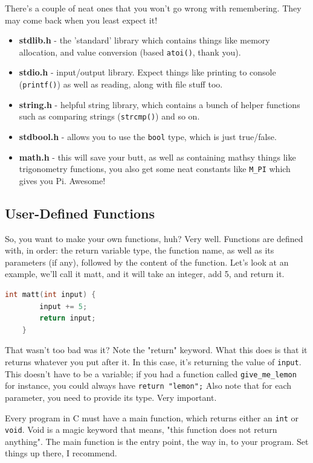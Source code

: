 There's a couple of neat ones that you won't go wrong with remembering. They may come back when you least expect it!
\begin{itemize}
    \item \textbf{stdlib.h} - the 'standard' library which contains things like memory allocation, and value conversion (based \texttt{atoi()}, thank you).
    \item \textbf{stdio.h} - input/output library. Expect things like printing to console (\texttt{printf()}) as well as reading, along with file stuff too.
    \item \textbf{string.h} - helpful string library, which contains a bunch of helper functions such as comparing strings (\texttt{strcmp()}) and so on.
    \item \textbf{stdbool.h} - allows you to use the \texttt{bool} type, which is just true/false.
    \item \textbf{math.h} - this will save your butt, as well as containing mathsy things like trigonometry functions, you also get some neat constants like \texttt{M\_PI} which gives you Pi. Awesome!
\end{itemize}

\subsection{User-Defined Functions}
So, you want to make your own functions, huh? Very well. Functions are defined with, in order: the return variable type, the function name, as well as its \glspl{parameter} (if any), followed by the content of the function. Let's look at an example, we'll call it matt, and it will take an integer, add 5, and return it.
\begin{lstlisting}[language=C]
    int matt(int input) {
        input += 5;
        return input;
    }
\end{lstlisting}

That wasn't too bad was it? Note the "return" keyword. What this does is that it returns whatever you put after it. In this case, it's returning the value of \texttt{input}. This doesn't have to be a variable; if you had a function called \texttt{give\_me\_lemon} for instance, you could always have \texttt{return "lemon";} Also note that for each parameter, you need to provide its type. Very important.

Every program in C must have a main function, which returns either an \texttt{int} or \texttt{void}. Void is a magic keyword that means, "this function does not return anything". The main function is the entry point, the way in, to your program. Set things up there, I recommend.

